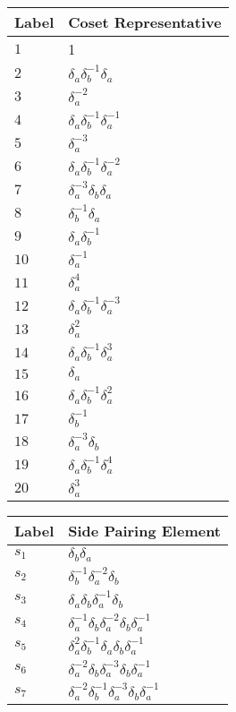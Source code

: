 \documentclass{article}
\begin{document}
\begin{center}
\begin{tabular}{ll}
\toprule
Label & Coset Representative\\
\midrule
$1$ & 1 \\
$2$ & $\delta_a^{}\delta_b^{-1}\delta_a^{}$ \\
$3$ & $\delta_a^{-2}$ \\
$4$ & $\delta_a^{}\delta_b^{-1}\delta_a^{-1}$ \\
$5$ & $\delta_a^{-3}$ \\
$6$ & $\delta_a^{}\delta_b^{-1}\delta_a^{-2}$ \\
$7$ & $\delta_a^{-3}\delta_b^{}\delta_a^{}$ \\
$8$ & $\delta_b^{-1}\delta_a^{}$ \\
$9$ & $\delta_a^{}\delta_b^{-1}$ \\
$10$ & $\delta_a^{-1}$ \\
$11$ & $\delta_a^{4}$ \\
$12$ & $\delta_a^{}\delta_b^{-1}\delta_a^{-3}$ \\
$13$ & $\delta_a^{2}$ \\
$14$ & $\delta_a^{}\delta_b^{-1}\delta_a^{3}$ \\
$15$ & $\delta_a^{}$ \\
$16$ & $\delta_a^{}\delta_b^{-1}\delta_a^{2}$ \\
$17$ & $\delta_b^{-1}$ \\
$18$ & $\delta_a^{-3}\delta_b^{}$ \\
$19$ & $\delta_a^{}\delta_b^{-1}\delta_a^{4}$ \\
$20$ & $\delta_a^{3}$ \\
\bottomrule
\end{tabular}
\hfill
\begin{tabular}{ll}
\toprule
Label & Side Pairing Element\\
\midrule
$s_{1}$ & $\delta_b^{}\delta_a^{}$ \\
$s_{2}$ & $\delta_b^{-1}\delta_a^{-2}\delta_b^{}$ \\
$s_{3}$ & $\delta_a^{}\delta_b^{}\delta_a^{-1}\delta_b^{}$ \\
$s_{4}$ & $\delta_a^{-1}\delta_b^{}\delta_a^{-2}\delta_b^{}\delta_a^{-1}$ \\
$s_{5}$ & $\delta_a^{2}\delta_b^{-1}\delta_a^{}\delta_b^{}\delta_a^{-1}$ \\
$s_{6}$ & $\delta_a^{-2}\delta_b^{}\delta_a^{-3}\delta_b^{}\delta_a^{-1}$ \\
$s_{7}$ & $\delta_a^{-2}\delta_b^{-1}\delta_a^{-3}\delta_b^{}\delta_a^{-1}$ \\

\end{tabular}
\end{center}
\end{document}
